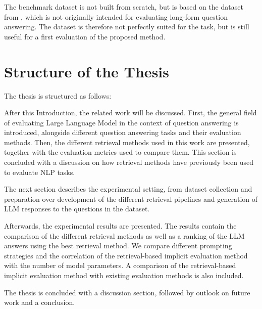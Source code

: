 The benchmark dataset is not built from scratch, but is based on the dataset from \cite{goeuriot:2021:Consumer}, which is not originally intended for evaluating long-form question answering.
The dataset is therefore not perfectly suited for the task, but is still useful for a first evaluation of the proposed method.


\section{Structure of the Thesis}\label{sec:structure-of-the-thesis}
The thesis is structured as follows:

After this Introduction, the related work will be discussed.
First, the general field of evaluating Large Language Model in the context of question answering is introduced, alongside different question answering tasks and their evaluation methods.
Then, the different retrieval methods used in this work are presented, together with the evaluation metrics used to compare them.
This section is concluded with a discussion on how retrieval methods have previously been used to evaluate NLP tasks.

The next section describes the experimental setting, from dataset collection and preparation over development of the different retrieval pipelines and generation of LLM responses to the questions in the dataset.

Afterwards, the experimental results are presented.
The results contain the comparison of the different retrieval methods as well as a ranking of the LLM answers using the best retrieval method.
We compare different prompting strategies and the correlation of the retrieval-based implicit evaluation method with the number of model parameters.
A comparison of the retrieval-based implicit evaluation method with existing evaluation methods is also included.

The thesis is concluded with a discussion section, followed by outlook on future work and a conclusion.